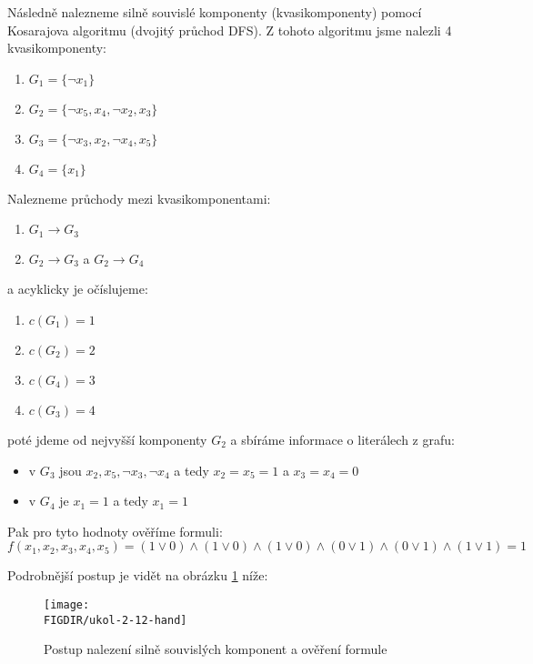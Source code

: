 \documentclass[10pt, a4paper]{ReportSheet}
\begin{document}
    Následně nalezneme silně souvislé komponenty (kvasikomponenty) pomocí Kosarajova algoritmu (dvojitý průchod DFS). Z tohoto algoritmu jsme nalezli 4 kvasikomponenty:
    \begin{enumerate}
        \item $G_1 = \{ \neg x_1 \}$
        \item $G_2 = \{ \neg x_5, x_4, \neg x_2, x_3 \}$
        \item $G_3 = \{ \neg x_3, x_2, \neg x_4, x_5 \}$
        \item $G_4 = \{ x_1 \}$
    \end{enumerate}

    Nalezneme průchody mezi kvasikomponentami:
    \begin{enumerate}
        \item $G_1 \rightarrow G_3$
        \item $G_2 \rightarrow G_3$ a $G_2 \rightarrow G_4$
    \end{enumerate}
    a acyklicky je očíslujeme:
    \begin{enumerate}
        \item $c(G_1) = 1$
        \item $c(G_2) = 2$
        \item $c(G_4) = 3$
        \item $c(G_3) = 4$
    \end{enumerate}
    poté jdeme od nejvyšší komponenty $G_2$ a sbíráme informace o literálech z grafu:
    \begin{itemize}
        \item v $G_3$ jsou $x_2, x_5, \neg x_3, \neg x_4$ a tedy $x_2 = x_5 = 1$ a $x_3 = x_4 = 0$
        \item v $G_4$ je $x_1 = 1$ a tedy $x_1 = 1$
    \end{itemize}

    Pak pro tyto hodnoty ověříme formuli:
    \begin{equation*}
        f(x_1, x_2, x_3, x_4, x_5) = (1 \lor 0) \land (1 \lor 0) \land
        (1 \lor 0) \land (0 \lor 1) \land (0 \lor 1) \land (1 \lor 1) = 1
    \end{equation*}

    Podrobnější postup je vidět na obrázku \ref{fig:ukol-2-12-hand} níže:
    \begin{figure}[H]
        \centering
        \texttt{[image: \\FIGDIR/ukol-2-12-hand]}
        \caption{Postup nalezení silně souvislých komponent a ověření formule}
        \label{fig:ukol-2-12-hand}
    \end{figure}
\end{document}
